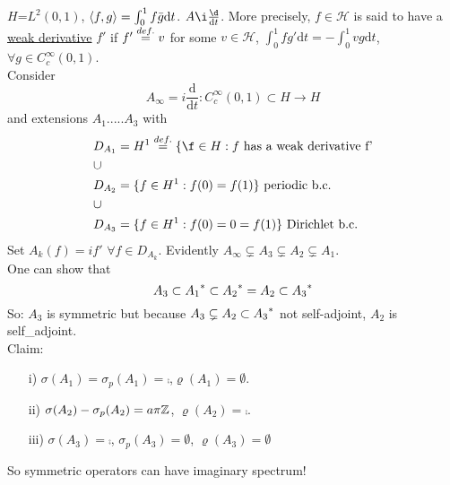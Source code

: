 \begin{example}\nl
    $H$=$L^2(0,1)$, $\left<{f},{g}\right>=\int_0^1f\bar{g} \mathrm{d}t$. $A\i\frac{\d}{\mathrm{d}t}$. More precisely, $f\in\mathcal{H}$ is said to have a \underline{weak derivative} $f'$ if $f'\stackrel{def.}{=}{v}$ for some $v\in \mathcal{H}$, $\int_0^1 fg'\mathrm{d}t=-\int_0^1 vg\mathrm{d}t$, $\forall g\in C^\infty_c(0,1)$.\\
    Consider
    $$
    A_\infty =i\frac{\mathrm{d}}{\mathrm{d}t}:C^\infty_c(0,1)\subset H\to H
    $$
    and extensions $A_1$.....$A_3$ with
    \begin{equation}
    \begin{aligned}
        &D_{A_1}=H^1\defeq\{\f\in H: f \text{ has a weak derivative  f'}\\
        &\cup\\
        &D_{A_2}=\{f\in H^1:f(0)=f(1)\}\text{ 
 periodic b.c.}\\
        &\cup\\
        &D_{A_3}=\{f\in H^1: f(0)=0=f(1)\}\text{ 
 Dirichlet b.c.}\\
    \end{aligned}
    \end{equation}
    Set $A_k(f)=if'$ $\forall f\in D_{A_k}$. Evidently $ A_\infty\subsetneq A_3\subsetneq A_2 \subsetneq A_1$.\\
    One can show that 
    $$
    A_3\subset{A_1}^*\subset{A_2}^*=A_2\subset{A_3}^*
    $$
    So: $A_3$ is symmetric but because $A_3\subsetneq A_2\subset {A_3}^*$ not self-adjoint, $A_2$ is self_adjoint.\\
    Claim:
    \begin{itemize}
        \item [i)] $\sigma(A_1)=\sigma_p(A_1)=\comp$,$ \varrho(A_1)=\emptyset$.
        \item [ii)] $\sigma(A_2)-\sigma_p(A_2)=a\pi\mathbb{Z}$, $\varrho(A_2)=\comp$.
        \item [iii)] $\sigma(A_3)=\comp$, $\sigma_p(A_3)=\emptyset$, $\varrho(A_3)=\emptyset$
    \end{itemize}
    So symmetric operators can have imaginary spectrum!
\end{example}
